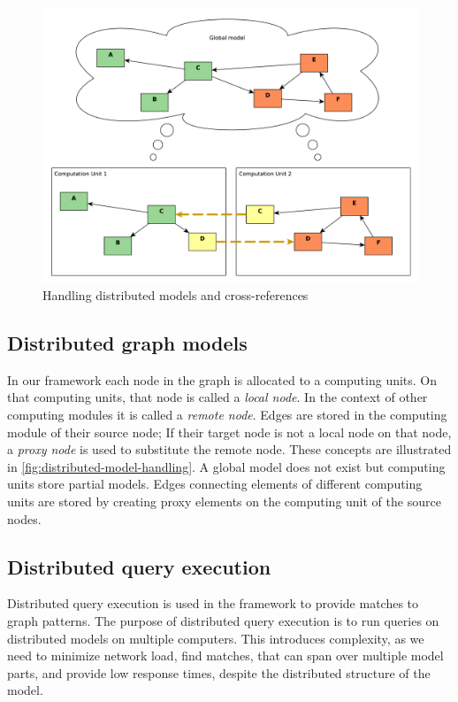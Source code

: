 \begin{figure}[h]
	\begin{center}
		\includegraphics[width=\textwidth]{figures/distributed-model-handling.pdf}
		\caption{Handling distributed models and cross-references}
		\label{fig:distributed-model-handling}
	\end{center}
\end{figure}

\subsection{Distributed graph models}

In our framework each node in the graph is allocated to a computing units. 
On that computing units, that node is called a \emph{local node}. 
In the context of other computing modules it is called a \emph{remote node}. 
Edges are stored in the computing module of their source node; 
If their target node is not a local node on that node, a \emph{proxy node} is used to substitute the remote node.
These concepts are illustrated in \autoref{fig:distributed-model-handling}.
A global model does not exist but computing units store partial models. Edges connecting elements of different computing units are stored by creating proxy elements on the computing unit of the source nodes. 


\subsection{Distributed query execution}

Distributed query execution is used in the framework to provide matches to graph patterns.
The purpose of distributed query execution is to run queries on distributed models on multiple computers. 
This introduces complexity, as we need to minimize network load, find matches, that can span over multiple model parts, and provide low response times, despite the distributed structure of the model.


